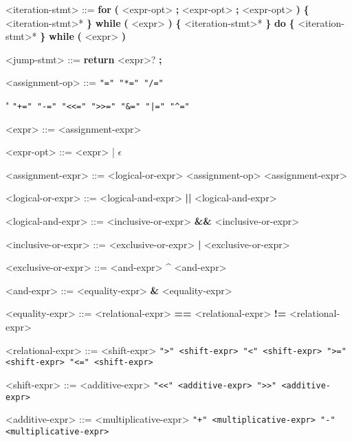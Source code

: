 \documentclass{article}
\begin{document}
\begin{grammar}
			<iteration-stmt> ::= \textbf{for} \textbf{(} <expr-opt> \textbf{;} <expr-opt> \textbf{;} <expr-opt> \textbf{)} \textbf{\{} <iteration-stmt>* \textbf{\}}
			\alt \textbf{while} \textbf{(} <expr> \textbf{)} \textbf{\{} <iteration-stmt>* \textbf{\}}
			\alt \textbf{do} \textbf{\{} <iteration-stmt>* \textbf{\}} \textbf{while} \textbf{(} <expr> \textbf{)} 
			
			<jump-stmt> ::= \textbf{return} <expr>? \textbf{;}
			
			<assignment-op> ::= \tt{"="}
			\alt \tt{"*="}
			\alt \tt{"/="}
			\alt \tt{"%
			\alt \tt{"+="}
			\alt \tt{"-="}
			\alt \tt{"<<="}
			\alt \tt{">>="}
			\alt \tt{"&="}
			\alt \tt{"|="}
			\alt \tt{"^="}
			
			<expr> ::= <assignment-expr>
			
			<expr-opt> ::= <expr> | $\epsilon$
			
			<assignment-expr> ::= <logical-or-expr>
			\alt <unary-expr> <assignment-op> <assignment-expr>
			
			<logical-or-expr> ::= <logical-and-expr>
			\alt <logical-or-expr> \textbf{||} <logical-and-expr>
			
			<logical-and-expr> ::= <inclusive-or-expr>
			\alt <logical-and-expr> \textbf{\&\&} <inclusive-or-expr>
			
			<inclusive-or-expr> ::= <exclusive-or-expr>
			\alt <inclusive-or-expr> \textbf{|} <exclusive-or-expr>
			
			<exclusive-or-expr> ::= <and-expr>
			\alt <exclusive-or-expr> \textbf{\^} <and-expr>
			
			<and-expr> ::= <equality-expr>
			\alt <and-expr> \textbf{\&} <equality-expr>
			
			<equality-expr> ::= <relational-expr>
			\alt <equality-expr> \textbf{==} <relational-expr>
			\alt <equality-expr> \textbf{!=} <relational-expr>
			
			<relational-expr> ::= <shift-expr>
			\alt <relational-expr> \tt{">"} <shift-expr>
			\alt <relational-expr> \tt{"<"} <shift-expr>
			\alt <relational-expr> \tt{">="} <shift-expr>
			\alt <relational-expr> \tt{"<="} <shift-expr>
			
			<shift-expr> ::= <additive-expr>
			\alt <shift-expr> \tt{"<<"} <additive-expr>
			\alt <shift-expr> \tt{">>"} <additive-expr>
			
			<additive-expr> ::= <multiplicative-expr>
			\alt <additive-expr> \tt{"+"} <multiplicative-expr>
			\alt <additive-expr> \tt{"-"} <multiplicative-expr>
			
}
\end{grammar}
\end{document}
